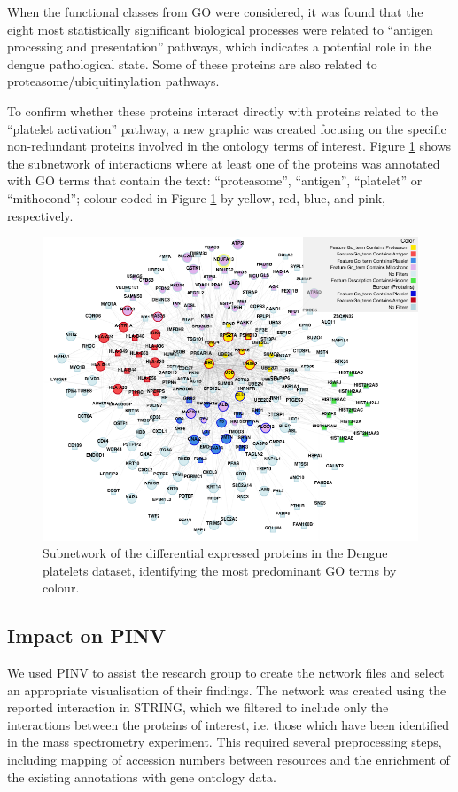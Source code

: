 When the functional classes from GO were considered, it was found that the eight most statistically significant biological processes were related to ``antigen processing and presentation'' pathways, which indicates a potential role in the dengue pathological state. Some of these proteins are also related to proteasome/ubiquitinylation pathways.

To confirm whether these proteins interact directly with proteins related to the ``platelet activation'' pathway, a new graphic was created focusing on the specific non-redundant proteins involved in the ontology terms of interest. Figure \ref{fig:pinv_platelets_2} shows the subnetwork of interactions where at least one of the proteins was annotated with GO terms that contain the text: ``proteasome'', ``antigen'', ``platelet'' or ``mithocond''; colour coded in Figure \ref{fig:pinv_platelets_2} by yellow, red, blue, and pink, respectively.

\begin{figure}
\centering
\includegraphics[width=\textwidth]{figures/pinv_platelets_2.png}
\caption[Subnetwork of the differential expressed proteins identifying the most predominant GO terms.]{Subnetwork of the differential expressed proteins in the Dengue platelets dataset, identifying the most predominant GO terms by colour.
\label{fig:pinv_platelets_2}}
\end{figure}

\subsection{Impact on PINV}
We used PINV to assist the research group to create the network files and select an appropriate visualisation of their findings. The network was created using the reported interaction in STRING, which we filtered to include only the interactions between the proteins of interest, i.e. those which have been identified in the mass spectrometry experiment. This required several preprocessing steps, including mapping of accession numbers between resources and the enrichment of the existing annotations with gene ontology data.

